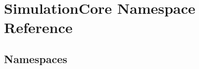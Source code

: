 \hypertarget{namespace_simulation_core}{}\section{Simulation\+Core Namespace Reference}
\label{namespace_simulation_core}
\subsection*{Namespaces}
\begin{DoxyCompactItemize}
\end{DoxyCompactItemize}
